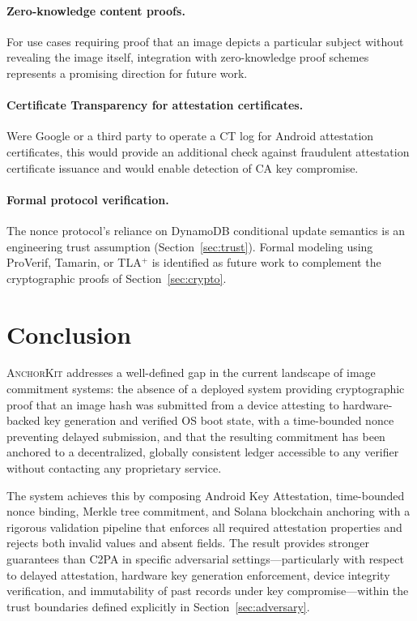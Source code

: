 \documentclass[11pt,a4paper]{article}
\newcommand{\AK}{\textsc{AnchorKit}\xspace}
\begin{document}
\paragraph{Zero-knowledge content proofs.} For use cases requiring proof that
an image depicts a particular subject without revealing the image itself,
integration with zero-knowledge proof schemes represents a promising direction
for future work.

\paragraph{Certificate Transparency for attestation certificates.} Were Google
or a third party to operate a CT log for Android attestation certificates, this
would provide an additional check against fraudulent attestation certificate
issuance and would enable detection of CA key compromise.

\paragraph{Formal protocol verification.} The nonce protocol's reliance on
DynamoDB conditional update semantics is an engineering trust assumption
(Section~\ref{sec:trust}).  Formal modeling using ProVerif, Tamarin, or
TLA$^+$ is identified as future work to complement the cryptographic proofs of
Section~\ref{sec:crypto}.

\section{Conclusion}
\label{sec:conclusion}

\AK addresses a well-defined gap in the current landscape of image commitment
systems: the absence of a deployed system providing cryptographic proof that an
image hash was submitted from a device attesting to hardware-backed key
generation and verified OS boot state, with a time-bounded nonce preventing
delayed submission, and that the resulting commitment has been anchored to a
decentralized, globally consistent ledger accessible to any verifier without
contacting any proprietary service.

The system achieves this by composing Android Key Attestation, time-bounded
nonce binding, Merkle tree commitment, and Solana blockchain anchoring with a
rigorous validation pipeline that enforces all required attestation properties
and rejects both invalid values and absent fields.  The result provides stronger
guarantees than C2PA in specific adversarial settings---particularly with respect
to delayed attestation, hardware key generation enforcement, device integrity
verification, and immutability of past records under key compromise---within the
trust boundaries defined explicitly in Section~\ref{sec:adversary}.
\end{document}
